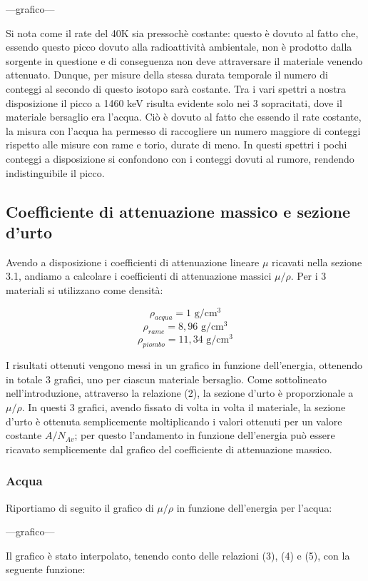 \documentclass[a4paper,10pt]{article}
\newcommand*{\unit}[1]{\ensuremath{\mathrm{\,#1}}}
\begin{document}
---grafico---

Si nota come il rate del 40K sia pressochè costante: questo è dovuto al fatto che, essendo questo picco dovuto alla radioattività ambientale, non è prodotto dalla sorgente in questione e di conseguenza non deve attraversare il materiale venendo attenuato. Dunque, per misure della stessa durata temporale il numero di conteggi al secondo di questo isotopo sarà costante. Tra i vari spettri a nostra disposizione il picco a 1460 keV risulta evidente solo nei 3 sopracitati, dove il materiale bersaglio era l'acqua. Ciò è dovuto al fatto che essendo il rate costante, la misura con l'acqua ha permesso di raccogliere un numero maggiore di conteggi rispetto alle misure con rame e torio, durate di meno. In questi spettri i pochi conteggi a disposizione si confondono con i conteggi dovuti al rumore, rendendo indistinguibile il picco.

\subsection{Coefficiente di attenuazione massico e sezione d'urto}
Avendo a disposizione i coefficienti di attenuazione lineare $\mu$ ricavati nella sezione 3.1, andiamo a calcolare i coefficienti di attenuazione massici $\mu/\rho$. Per i 3 materiali si utilizzano come densità:

$$
	\rho_{acqua} = 1\, \unit{g/cm^3}
$$
$$
	\rho_{rame} = 8,96\, \unit{g/cm^3}
$$
$$
	\rho_{piombo} = 11,34\, \unit{g/cm^3}
$$

I risultati ottenuti vengono messi in un grafico in funzione dell'energia, ottenendo in totale 3 grafici, uno per ciascun materiale bersaglio. Come sottolineato nell'introduzione, attraverso la relazione (2), la sezione d'urto è proporzionale a $\mu/\rho$. In questi 3 grafici, avendo fissato di volta in volta il materiale, la sezione d'urto è ottenuta semplicemente moltiplicando i valori ottenuti per un valore costante $A/N_{Av}$; per questo l'andamento in funzione dell'energia può essere ricavato semplicemente dal grafico del coefficiente di attenuazione massico.

\subsubsection{Acqua}
Riportiamo di seguito il grafico di $\mu/\rho$ in funzione dell'energia per l'acqua:

---grafico---

Il grafico è stato interpolato, tenendo conto delle relazioni (3), (4) e (5), con la seguente funzione:
\end{document}
